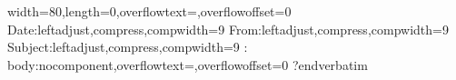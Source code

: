 
\verbatim
width=80,length=0,overflowtext=,overflowoffset=0
Date:leftadjust,compress,compwidth=9
From:leftadjust,compress,compwidth=9
Subject:leftadjust,compress,compwidth=9
:
body:nocomponent,overflowtext=,overflowoffset=0
?endverbatim
